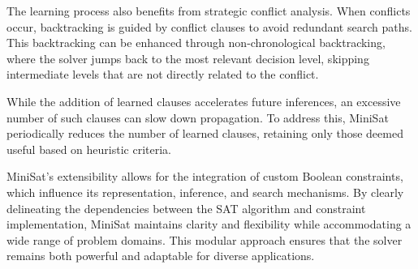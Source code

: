 \documentclass[runningheads]{llncs}
\begin{document}
The learning process also benefits from strategic conflict analysis. When conflicts occur, backtracking is guided by conflict clauses to avoid redundant search paths. This backtracking can be enhanced through non-chronological backtracking, where the solver jumps back to the most relevant decision level, skipping intermediate levels that are not directly related to the conflict.

While the addition of learned clauses accelerates future inferences, an excessive number of such clauses can slow down propagation. To address this, MiniSat periodically reduces the number of learned clauses, retaining only those deemed useful based on heuristic criteria.

MiniSat’s extensibility allows for the integration of custom Boolean constraints, which influence its representation, inference, and search mechanisms. By clearly delineating the dependencies between the SAT algorithm and constraint implementation, MiniSat maintains clarity and flexibility while accommodating a wide range of problem domains. This modular approach ensures that the solver remains both powerful and adaptable for diverse applications.
\end{document}
